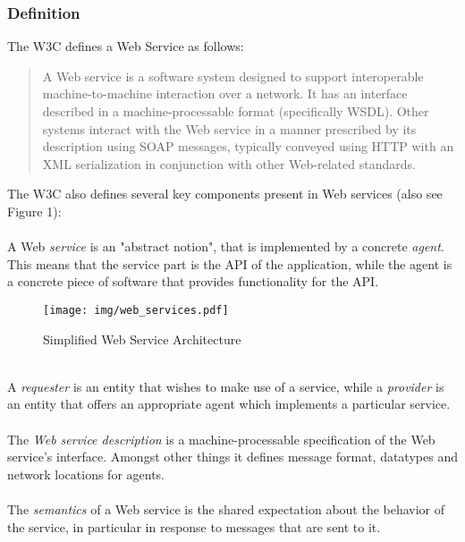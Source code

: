 \subsubsection{Definition}
The W3C defines a Web Service as follows: 
\begin{quote}
A Web service is a software system designed to support interoperable machine-to-machine interaction over a network. It has an interface described in a machine-processable format (specifically WSDL). Other systems interact with the Web service in a manner prescribed by its description using SOAP messages, typically conveyed using HTTP with an XML serialization in conjunction with other Web-related standards. \cite{WSARCH}
\end{quote}
The W3C also defines several key components present in Web services (also see Figure 1):
\\ \\
A Web \emph{service} is an "abstract notion", that is implemented by a concrete \emph{agent}. This means that the service part is the API of the application, while the agent is a concrete piece of software that provides functionality for the API. 
\begin{figure}[htp]
\centering
\texttt{[image: img/web\_services.pdf]}
\caption{Simplified Web Service Architecture}\label{fig:erptsqfit}
\end{figure}
\\
A \emph{requester} is an entity that wishes to make use of a service, while a \emph{provider} is an entity that offers an appropriate agent which implements a particular service. 
\\ \\
The \emph{Web service description} is a machine-processable specification of the Web service's interface. Amongst other things it defines message format, datatypes and network locations for agents. 
\\ \\
The \emph{semantics} of a Web service is the shared expectation about the behavior of the service, in particular in response to messages that are sent to it. \cite{WSARCH}

